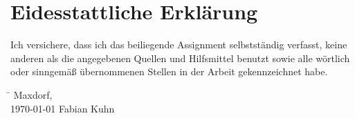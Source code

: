 \section*{Eidesstattliche Erklärung}
Ich versichere, dass ich das beiliegende Assignment selbstständig verfasst, keine anderen als die 
angegebenen Quellen und Hilfsmittel benutzt sowie alle wörtlich oder sinngemäß übernommenen 
Stellen in der Arbeit gekennzeichnet habe. 

\vspace{1cm}

\begin{tabbing}
    \hspace{8cm} \= \kill
    Maxdorf, \> \underline{\hspace{5cm}} \\
    \mydate\today \> Fabian Kuhn
\end{tabbing}